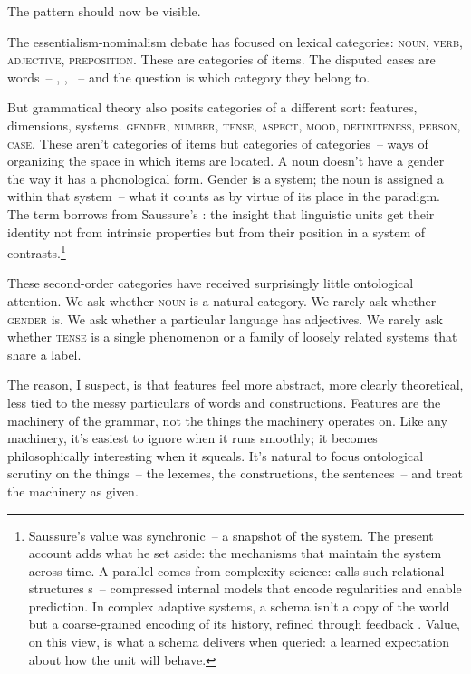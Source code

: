 The pattern should now be visible.

The essentialism-nominalism debate has focused on lexical categories: \textsc{noun}, \textsc{verb}, \textsc{adjective}, \textsc{preposition}. These are categories of items. The disputed cases are words~-- , , ~-- and the question is which category they belong to.

But grammatical theory also posits categories of a different sort: features, dimensions, systems. \textsc{gender}, \textsc{number}, \textsc{tense}, \textsc{aspect}, \textsc{mood}, \textsc{definiteness}, \textsc{person}, \textsc{case}. These aren't categories of items but categories of categories~-- ways of organizing the space in which items are located. A noun doesn't have a gender the way it has a phonological form. Gender is a system; the noun is assigned a  within that system~-- what it counts as by virtue of its place in the paradigm. The term borrows from Saussure's : the insight that linguistic units get their identity not from intrinsic properties but from their position in a system of contrasts.\footnote{Saussure's value was synchronic~-- a snapshot of the system. The present account adds what he set aside: the mechanisms that maintain the system across time. A parallel comes from complexity science: \textcite{gellmann1994} calls such relational structures s~-- compressed internal models that encode regularities and enable prediction. In complex adaptive systems, a schema isn't a copy of the world but a coarse-grained encoding of its history, refined through feedback \autocite{holland1992}. Value, on this view, is what a schema delivers when queried: a learned expectation about how the unit will behave.}

These second-order categories have received surprisingly little ontological attention. We ask whether \textsc{noun} is a natural category. We rarely ask whether \textsc{gender} is. We ask whether a particular language has adjectives. We rarely ask whether \textsc{tense} is a single phenomenon or a family of loosely related systems that share a label.

The reason, I suspect, is that features feel more abstract, more clearly theoretical, less tied to the messy particulars of words and constructions. Features are the machinery of the grammar, not the things the machinery operates on. Like any machinery, it's easiest to ignore when it runs smoothly; it becomes philosophically interesting when it squeals. It's natural to focus ontological scrutiny on the things~-- the lexemes, the constructions, the sentences~-- and treat the machinery as given.

